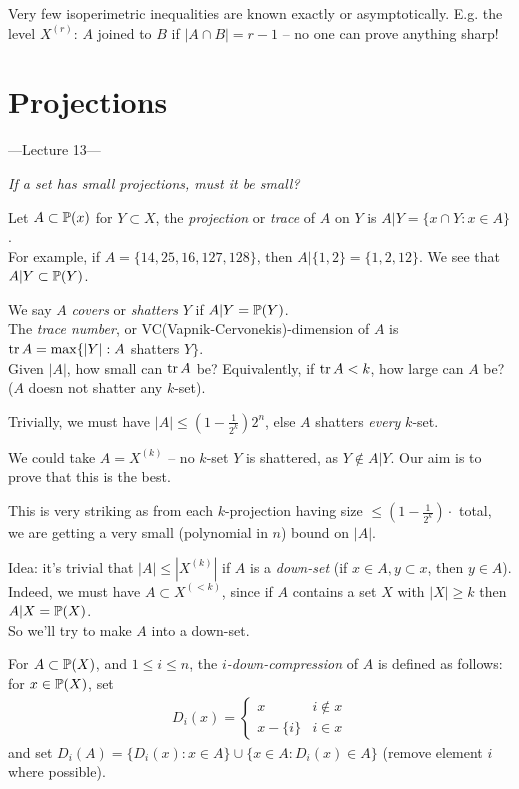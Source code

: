 \documentclass[a4paper]{article}
\begin{document}
Very few isoperimetric inequalities are known exactly or asymptotically. E.g. the level $X^{(r)}$: $A$ joined to $B$ if $|A \cap B| = r-1$ -- no one can prove anything sharp!

\newpage

\section{Projections}

---Lecture 13---

\emph{If a set has small projections, must it be small?}

Let $A \subset \P(x)$ for $Y \subset X$, the \emph{projection} or \emph{trace} of $A$ on $Y$ is $A|Y = \{x \cap Y:x \in A\}$.\\
For example, if $A=\{14,25,16,127,128\}$, then $A|\{1,2\} = \{1,2,12\}$. We see that $A|Y \subset \P(Y)$.

We say $A$ \emph{covers} or \emph{shatters} $Y$ if $A|Y = \P(Y)$.\\
The \emph{trace number}, or VC(Vapnik-Cervonekis)-dimension of $A$ is $\tr A = \max\{|Y|:A$ shatters $Y\}$.\\
Given $|A|$, how small can $\tr A$ be? Equivalently, if $\tr A < k$, how large can $A$ be? ($A$ doesn not shatter any $k$-set).

Trivially, we must have $|A| \leq (1-\frac{1}{2^k}) 2^n$, else $A$ shatters \emph{every} $k$-set.

We could take $A=X^{(k)}$ -- no $k$-set $Y$ is shattered, as $Y \not\in A|Y$. Our aim is to prove that this is the best.

\begin{rem}
    This is very striking as from each $k$-projection having size $\leq (1-\frac{1}{2^k}) \cdot$ total, we are getting a very small (polynomial in $n$) bound on $|A|$.
\end{rem}

Idea: it's trivial that $|A| \leq |X^{(k)}|$ if $A$ is a \emph{down-set} (if $x \in A, y \subset x$, then $y \in A$). Indeed, we must have $A \subset X^{(<k)}$, since if $A$ contains a set $X$ with $|X| \geq k$ then $A|X = \P(X)$.\\
So we'll try to make $A$ into a down-set.

For $A \subset \P(X)$, and $1 \leq i \leq n$, the \emph{$i$-down-compression} of $A$ is defined as follows: for $x \in \P(X)$, set 
\begin{equation*}
    \begin{aligned}
        D_i(x) = \left\{\begin{array}{ll}
            x & i \not\in x\\
            x-\{i\} & i \in x
        \end{array}
        \right.
    \end{aligned}
\end{equation*}
and set $D_i(A) = \{D_i(x):x \in A\} \cup \{x \in A: D_i(x) \in A\}$ (remove element $i$ where possible).
\end{document}
